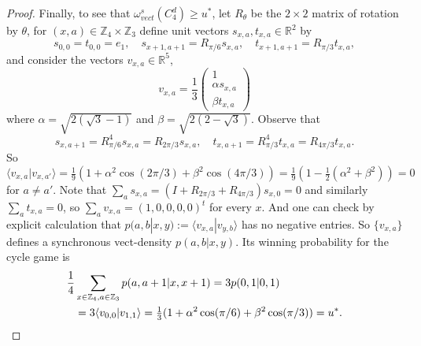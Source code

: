 \documentclass[10pt,a4paper]{amsart}
\newcommand{\bb}[1]{\mathbb{#1}}
\begin{document}
\begin{proof}
  Finally, to see that $\omega_{vect}^s(C_4^d)\ge u^*$,
  let  $R_\theta$ be the $2\times 2$ matrix of rotation by $\theta$, for $(x,a)\in \bb Z_4\times \bb Z_3$ define unit vectors $s_{x,a},t_{x,a}\in \bb R^2$ by
   \[s_{0,0}=t_{0,0}=e_1,\quad s_{x+1,a+1}=R_{\pi/6}s_{x,a},\quad t_{x+1,a+1}=R_{\pi/3}t_{x,a},\]
   and consider the vectors $v_{x,a}\in \bb R^5$,
  \[ v_{x,a}=\frac13\begin{pmatrix}1\\ \alpha s_{x,a}\\\beta t_{x,a}
     \end{pmatrix}
   \]
   where $\alpha=\sqrt{2(\sqrt{3}-1)}$ and $\beta=\sqrt{2(2-\sqrt3)}$. Observe that
   \[ s_{x,a+1}=R_{\pi/6}^4s_{x,a}=R_{2\pi/3}s_{x,a},\quad
     t_{x,a+1}=R_{\pi/3}^4t_{x,a}=R_{4\pi/3}t_{x,a}.\] So
   \[\langle
    v_{x,a}|v_{x,a'}\rangle=\tfrac19(1+\alpha^2\cos(2\pi/3)+\beta^2\cos(4\pi/3))=\tfrac19(1-\tfrac12(\alpha^2+\beta^2))=0\]
   for $a\ne a'$.  Note that
   $\sum_{a}s_{x,a}=(I+R_{2\pi/3}+R_{4\pi/3})s_{x,0}=0$ and similarly
   $\sum_at_{x,a}=0$, so $\sum_a v_{x,a}=(1,0,0,0,0)^t$ for every
   $x$. And one can check by explicit calculation that
   $p(a,b|x,y):=\langle v_{x,a}|v_{y,b}\rangle$ has no negative
   entries. So $\{v_{x,a}\}$ defines a synchronous vect-density $p(a,b|x,y)$. Its
   winning probability for the cycle game is
   \begin{align*}\frac14&\sum_{x\in \bb Z_4,a\in \bb Z_3}p(a,a+1|x,x+1)=3p(0,1|0,1)\\&=3\langle
     v_{0,0}|v_{1,1}\rangle=\tfrac13(1+\alpha^2\cos(\pi/6)+\beta^2\cos(\pi/3))=u^*.\qedhere
   \end{align*}
 \end{proof}
\end{document}
